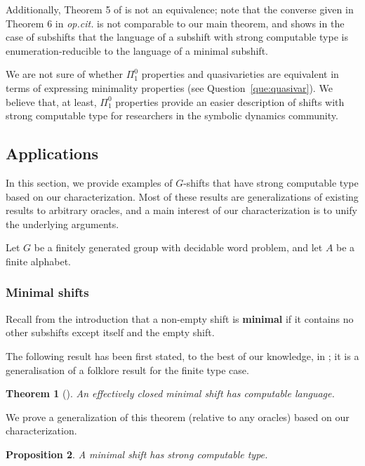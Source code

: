 \documentclass[french,american]{article}
\theoremstyle{plain}
\newtheorem{theorem}{Theorem}[section]
\newtheorem{proposition}[theorem]{Proposition}
\theoremstyle{definition}
\theoremstyle{remark}
\theoremstyle{plain}
\begin{document}
Additionally, Theorem 5 of \cite{jeandel2017enumeration} is not an equivalence; note that the converse given in Theorem 6 in \emph{op.cit.} is not comparable to our main theorem, and shows in the case of subshifts that the language of a subshift with strong computable type is enumeration-reducible to the language of a minimal subshift.

We are not sure of whether $\Pi_1^0$ properties and quasivarieties are equivalent in terms of expressing minimality properties (see Question~\ref{que:quasivar}). We believe that, at least, $\Pi_1^0$ properties provide an easier description of shifts with strong computable type for researchers in the symbolic dynamics community.


\subsection{Applications}\label{subsec:Application}

In this section, we provide examples of $G$-shifts that have strong
computable type based on our characterization. Most of these results are generalizations of existing results to arbitrary oracles, and a main interest of our characterization is to unify the underlying arguments.

Let $G$ be a finitely generated group with decidable word problem,
and let $A$ be a finite alphabet.

\subsubsection{Minimal shifts}\label{subsec:Minimal-subshifts}

Recall from the introduction that a non-empty shift is \textbf{minimal}
if it contains no other subshifts except itself and the empty shift.

The following result has been first stated, to the best of our knowledge,
in \cite{delvenneblondel}; it is a generalisation of a folklore result
for the finite type case.
\begin{theorem}[\cite{delvenneblondel}]
 An effectively closed minimal shift has computable language.
\end{theorem}

We prove a generalization of this theorem (relative to any oracles) based on our characterization.


\begin{proposition}
A minimal shift has strong computable type.
\end{proposition}
\end{document}
